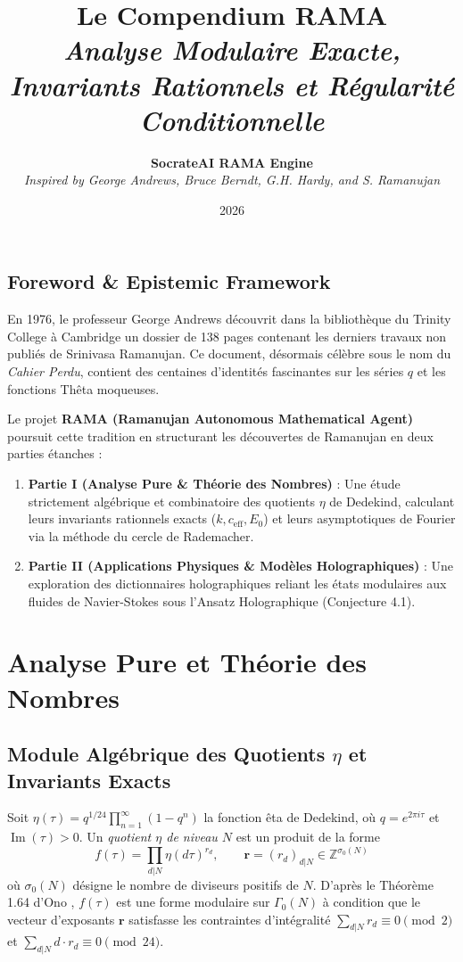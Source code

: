 \documentclass[11pt,twoside,openright]{book}
\title{\Huge\textbf{Le Compendium RAMA}\\[0.5em] \large\textit{Analyse Modulaire Exacte, Invariants Rationnels et Régularité Conditionnelle}}
\author{\textbf{SocrateAI RAMA Engine} \\ \textit{Inspired by George Andrews, Bruce Berndt, G.H. Hardy, and S. Ramanujan}}
\date{2026}
\begin{document}
\frontmatter
\maketitle

\chapter*{Foreword \& Epistemic Framework}

En 1976, le professeur George Andrews découvrit dans la bibliothèque du Trinity College à Cambridge un dossier de 138 pages contenant les derniers travaux non publiés de Srinivasa Ramanujan. Ce document, désormais célèbre sous le nom du \textit{Cahier Perdu}, contient des centaines d'identités fascinantes sur les séries $q$ et les fonctions Thêta moqueuses.

Le projet \textbf{RAMA (Ramanujan Autonomous Mathematical Agent)} poursuit cette tradition en structurant les découvertes de Ramanujan en deux parties étanches :
\begin{enumerate}
  \item \textbf{Partie I (Analyse Pure \& Théorie des Nombres)} : Une étude strictement algébrique et combinatoire des quotients $\eta$ de Dedekind, calculant leurs invariants rationnels exacts ($k, c_{\text{eff}}, E_0$) et leurs asymptotiques de Fourier via la méthode du cercle de Rademacher.
  \item \textbf{Partie II (Applications Physiques \& Modèles Holographiques)} : Une exploration des dictionnaires holographiques reliant les états modulaires aux fluides de Navier-Stokes sous l'Ansatz Holographique (Conjecture 4.1).
\end{enumerate}

\tableofcontents
\mainmatter
\part{Analyse Pure et Théorie des Nombres}

\chapter{Module Algébrique des Quotients $\eta$ et Invariants Exacts}

Soit $\eta(\tau) = q^{1/24} \prod_{n=1}^\infty (1 - q^n)$ la fonction êta de Dedekind, où $q = e^{2\pi i \tau}$ et $\operatorname{Im}(\tau) > 0$. Un \emph{quotient $\eta$ de niveau $N$} est un produit de la forme
\[ f(\tau) = \prod_{d | N} \eta(d\tau)^{r_d}, \qquad \mathbf{r} = (r_d)_{d | N} \in \mathbb{Z}^{\sigma_0(N)} \]
où $\sigma_0(N)$ désigne le nombre de diviseurs positifs de $N$. D'après le Théorème 1.64 d'Ono \cite{ono2004}, $f(\tau)$ est une forme modulaire sur $\Gamma_0(N)$ à condition que le vecteur d'exposants $\mathbf{r}$ satisfasse les contraintes d'intégralité $\sum_{d|N} r_d \equiv 0 \pmod{2}$ et $\sum_{d|N} d \cdot r_d \equiv 0 \pmod{24}$.
\end{document}
